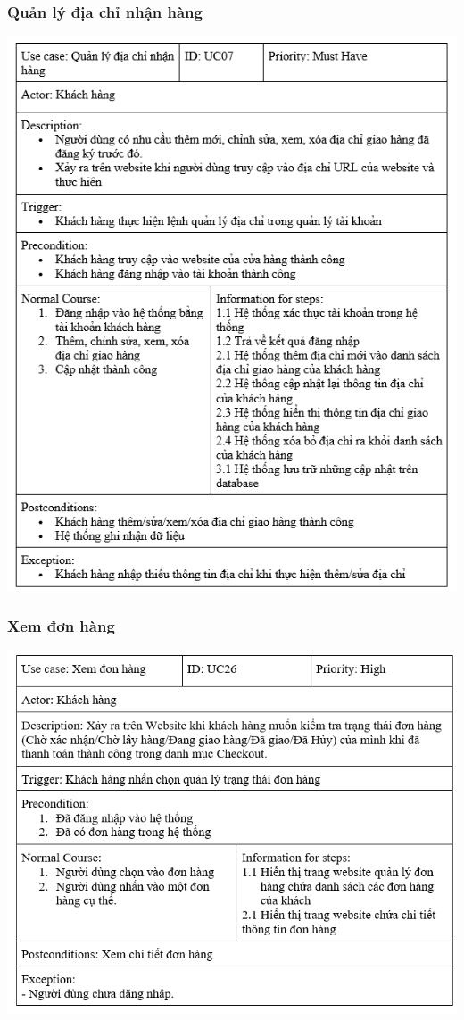 \documentclass[12pt,a4paper,2sides]{report}
\begin{document}
\subsubsection{Quản lý địa chỉ nhận hàng}
    \includegraphics[width=1\linewidth]{lib/usecase/quanlydiachinh.png}\\\vspace*{1cm}
\subsubsection{Xem đơn hàng}
    \includegraphics[width=1\linewidth]{lib/usecase/xemdonhang.png}\\\vspace*{1cm}
\end{document}
